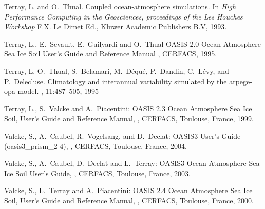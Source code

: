 \begin{thebibliography}{10}
Terray, L. and O.~Thual.
\newblock Coupled ocean-atmosphere simulations. 
\newblock In {\em High Performance Computing in the Geosciences,
proceedings of the Les Houches Workshop}
\newblock F.X. Le Dimet Ed., Kluwer Academic Publishers B.V, 1993.

Terray, L., E.~Sevault, E.~Guilyardi and O.~Thual
\newblock OASIS 2.0 Ocean Atmosphere Sea Ice Soil User's Guide and Reference Manual
, CERFACS, 1995.

Terray, L. O.~Thual, S.~Belamari, M.~D\'equ\'e, P.~Dandin, C.~L\'evy, and
P.~Delecluse. 
\newblock Climatology and interannual variability simulated by the arpege-opa
model. 
, 11:487--505, 1995

Terray, L., S.~Valcke and A.~Piacentini:
\newblock OASIS 2.3 Ocean Atmosphere Sea Ice Soil, User's Guide and
Reference Manual,
, 
\newblock CERFACS, Toulouse, France, 1999.

Valcke, S., A.~Caubel, R.~Vogelsang, and D.~Declat:       
\newblock OASIS3 User's Guide (oasis3\_prism\_2-4),
, 
\newblock CERFACS, Toulouse, France, 2004.

Valcke, S., A.~Caubel, D.~Declat and L.~Terray:        
\newblock OASIS3 Ocean Atmosphere Sea Ice Soil User's Guide,
, 
\newblock CERFACS, Toulouse, France, 2003.

Valcke, S., L.~Terray and A.~Piacentini:
\newblock OASIS 2.4 Ocean Atmosphere Sea Ice Soil, User's Guide and
Reference Manual,
, 
\newblock CERFACS, Toulouse, France, 2000.







\end{thebibliography}
